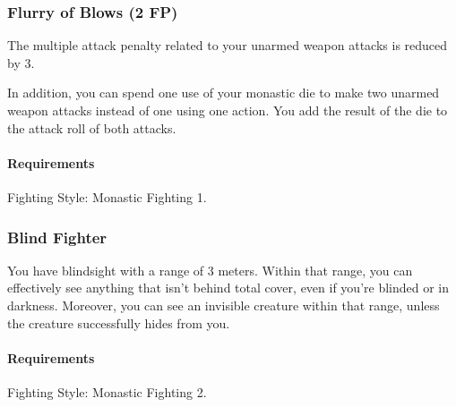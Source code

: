 \subsubsection{Flurry of Blows (2 FP)} \label{feat::flurryofblows}
    The multiple attack penalty related to your unarmed weapon attacks is reduced by 3.

    In addition, you can spend one use of your monastic die to make two unarmed weapon attacks instead of one using one action.
    You add the result of the die to the attack roll of both attacks.
    \paragraph{Requirements} Fighting Style: Monastic Fighting 1.
\subsubsection{Blind Fighter} \label{feat::blindfighter}
    You have blindsight with a range of 3 meters.
    Within that range, you can effectively see anything that isn't behind total cover, even if you're blinded or in darkness.
    Moreover, you can see an invisible creature within that range, unless the creature successfully hides from you.
    \paragraph{Requirements} Fighting Style: Monastic Fighting 2.
